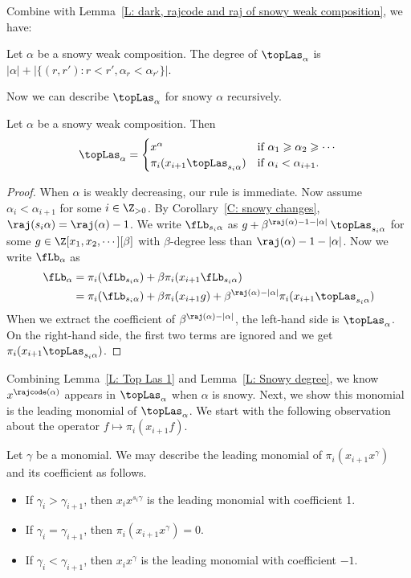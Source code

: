 Combine with Lemma~\ref{L: dark, rajcode and raj of snowy weak composition},
we have: 
\begin{cor}
Let $\alpha$ be a snowy weak composition.
The degree of $\topLas_\alpha$
is $|\alpha| + |\{(r, r'): r < r', \alpha_r < \alpha_{r'}\}|$.
\end{cor}

Now we can describe $\topLas_\alpha$ for snowy 
$\alpha$ recursively.
\begin{lemma}\label{L: recursive top Las}
Let $\alpha$ be a snowy weak composition. 
Then
\begin{align}
\topLas_\alpha = \begin{cases}
x^\alpha & \text{if $\alpha_1 \geqslant \alpha_2 \geqslant \cdots$} \\
\pi_i (x_{i+1} \topLas_{s_i\alpha}) &\text{if $\alpha_i<\alpha_{i+1}$.}
\end{cases}
\end{align}
\end{lemma}
\begin{proof}
When $\alpha$ is weakly decreasing, 
our rule is immediate.
Now assume $\alpha_i < \alpha_{i+1}$ for some $i\in \Z_{>0}$.
By Corollary~\ref{C: snowy changes},
$\raj(s_i \alpha) = \raj(\alpha) - 1$.
We write $\fLb_{s_i \alpha}$
as $g + \beta^{\raj(\alpha) - 1 - |\alpha|} \: \topLas_{s_i \alpha}$
for some $g \in \Z[x_1, x_2, \cdots][\beta]$
with $\beta$-degree less than 
$\raj(\alpha) - 1 - |\alpha|$.
Now we write $\fLb_\alpha$ as
\begin{align*}
\fLb_\alpha & = \pi_i(\fLb_{s_i \alpha}) 
+ \beta \pi_i(x_{i+1}\fLb_{s_i \alpha})  \\ 
& =\pi_i(\fLb_{s_i \alpha})
+ \beta \pi_i(x_{i+1}g) + \beta^{\raj(\alpha) - |\alpha|} \pi_i(x_{i+1}\topLas_{s_i \alpha})   
\end{align*}
When we extract the coefficient of $\beta^{\raj(\alpha) - |\alpha|}$,
the left-hand side is $\topLas_\alpha$.
On the right-hand side, 
the first two terms are ignored and 
we get $\pi_i(x_{i+1}\topLas_{s_i \alpha})$.
\end{proof}

Combining Lemma~\ref{L: Top Las 1} and Lemma~\ref{L: Snowy degree},
we know $x^{\rajcode(\alpha)}$ appears in $\topLas_\alpha$
when $\alpha$ is snowy. 
Next, we show this monomial
is the leading monomial of $\topLas_\alpha$.
We start with the following observation 
about the operator $f \mapsto \pi_i(x_{i+1} f)$.
\begin{rem}
\label{R: leading}
Let $\gamma$ be a monomial.
We may describe the leading monomial of
$\pi_i(x_{i+1}x^\gamma)$ and its coefficient as follows. 
\begin{itemize}
\item If $\gamma_i > \gamma_{i+1}$,
then $x_i x^{s_i \gamma}$ is the leading monomial
with coefficient 1.
\item If $\gamma_i = \gamma_{i+1}$,
then $\pi_i(x_{i+1}x^\gamma) = 0$. 
\item If $\gamma_i < \gamma_{i+1}$,
then $x_i x^\gamma$ is the leading monomial 
with coefficient $-1$. 
\end{itemize}
\end{rem}

